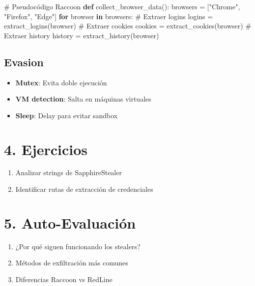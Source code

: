 \documentclass[
  letterpaper,
]{report}
\newenvironment{Shaded}{\begin{snugshade}}{\end{snugshade}}
\newcommand{\CommentTok}[1]{\textcolor[rgb]{0.37,0.37,0.37}{#1}}
\newcommand{\ControlFlowTok}[1]{\textcolor[rgb]{0.00,0.23,0.31}{\textbf{#1}}}
\newcommand{\KeywordTok}[1]{\textcolor[rgb]{0.00,0.23,0.31}{\textbf{#1}}}
\newcommand{\NormalTok}[1]{\textcolor[rgb]{0.00,0.23,0.31}{#1}}
\newcommand{\OperatorTok}[1]{\textcolor[rgb]{0.37,0.37,0.37}{#1}}
\newcommand{\StringTok}[1]{\textcolor[rgb]{0.13,0.47,0.30}{#1}}
\providecommand{\tightlist}{%
  \setlength{\itemsep}{0pt}\setlength{\parskip}{0pt}}
\begin{document}
\begin{Shaded}
\begin{Highlighting}[]
\CommentTok{\# Pseudocódigo Raccoon}
\KeywordTok{def}\NormalTok{ collect\_browser\_data():}
\NormalTok{    browsers }\OperatorTok{=}\NormalTok{ [}\StringTok{"Chrome"}\NormalTok{, }\StringTok{"Firefox"}\NormalTok{, }\StringTok{"Edge"}\NormalTok{]}
    \ControlFlowTok{for}\NormalTok{ browser }\KeywordTok{in}\NormalTok{ browsers:}
        \CommentTok{\# Extraer logins}
\NormalTok{        logins }\OperatorTok{=}\NormalTok{ extract\_logins(browser)}
        \CommentTok{\# Extraer cookies}
\NormalTok{        cookies }\OperatorTok{=}\NormalTok{ extract\_cookies(browser)}
        \CommentTok{\# Extraer history}
\NormalTok{        history }\OperatorTok{=}\NormalTok{ extract\_history(browser)}
\end{Highlighting}
\end{Shaded}

\subsection{Evasion}\label{evasion}

\begin{itemize}
\tightlist
\item
  \textbf{Mutex}: Evita doble ejecución
\item
  \textbf{VM detection}: Salta en máquinas virtuales
\item
  \textbf{Sleep}: Delay para evitar sandbox
\end{itemize}

\section{4. Ejercicios}\label{ejercicios-3}

\begin{enumerate}
\def\labelenumi{\arabic{enumi}.}
\tightlist
\item
  Analizar strings de SapphireStealer
\item
  Identificar rutas de extracción de credenciales
\end{enumerate}

\section{5. Auto-Evaluación}\label{auto-evaluaciuxf3n-4}

\begin{enumerate}
\def\labelenumi{\arabic{enumi}.}
\tightlist
\item
  ¿Por qué siguen funcionando los stealers?
\item
  Métodos de exfiltración más comunes
\item
  Diferencias Raccoon vs RedLine
\end{enumerate}
\end{document}

